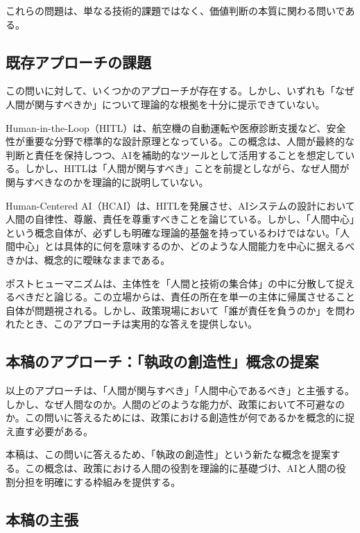 \documentclass{keikaku}
\begin{document}
これらの問題は、単なる技術的課題ではなく、価値判断の本質に関わる問いである。

\subsection{既存アプローチの課題}

この問いに対して、いくつかのアプローチが存在する。しかし、いずれも「なぜ人間が関与すべきか」について理論的な根拠を十分に提示できていない。

Human-in-the-Loop（HITL）は、航空機の自動運転や医療診断支援など、安全性が重要な分野で標準的な設計原理となっている\cite{parasuraman2008}。この概念は、人間が最終的な判断と責任を保持しつつ、AIを補助的なツールとして活用することを想定している。しかし、HITLは「人間が関与すべき」ことを前提としながら、なぜ人間が関与すべきなのかを理論的に説明していない。

Human-Centered AI（HCAI）は、HITLを発展させ、AIシステムの設計において人間の自律性、尊厳、責任を尊重すべきことを論じている\cite{shneiderman2022}。しかし、「人間中心」という概念自体が、必ずしも明確な理論的基盤を持っているわけではない\cite{humphrey2024}。「人間中心」とは具体的に何を意味するのか、どのような人間能力を中心に据えるべきかは、概念的に曖昧なままである。

ポストヒューマニズムは、主体性を「人間と技術の集合体」の中に分散して捉えるべきだと論じる\cite{hedayati2024}。この立場からは、責任の所在を単一の主体に帰属させること自体が問題視される。しかし、政策現場において「誰が責任を負うのか」を問われたとき、このアプローチは実用的な答えを提供しない。

\subsection{本稿のアプローチ：「執政の創造性」概念の提案}

以上のアプローチは、「人間が関与すべき」「人間中心であるべき」と主張する。しかし、なぜ人間なのか。人間のどのような能力が、政策において不可避なのか。この問いに答えるためには、政策における創造性が何であるかを概念的に捉え直す必要がある。

本稿は、この問いに答えるため、「執政の創造性」という新たな概念を提案する。この概念は、政策における人間の役割を理論的に基礎づけ、AIと人間の役割分担を明確にする枠組みを提供する。

\subsection{本稿の主張}
\end{document}
